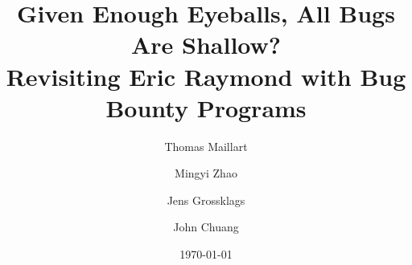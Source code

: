 \documentclass[12pt,longbibliography]{revtex4-1}
\begin{document}
\title{\large Given Enough Eyeballs, All Bugs Are Shallow? \\ Revisiting Eric Raymond with Bug Bounty Programs}

\author{Thomas Maillart}

\author{Mingyi Zhao}

\author{Jens Grossklags}

\author{John Chuang}




\date{\today}


\begin{abstract}
\vspace{1cm}

\end{abstract}

\maketitle

%
%
%









%

\end{document}
